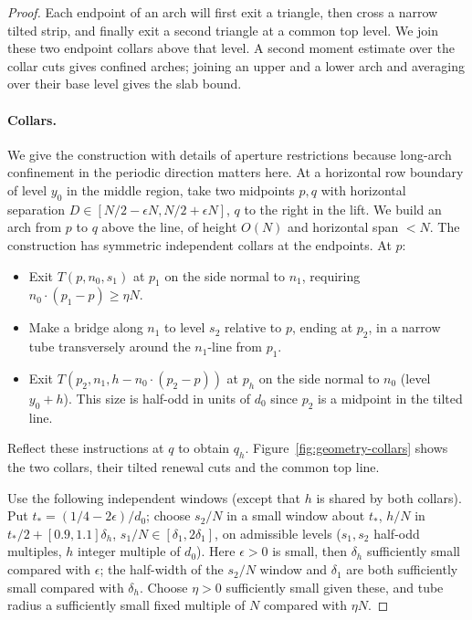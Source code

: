 \begin{proof}
Each endpoint of an arch will first exit a triangle, then cross a narrow tilted strip, and finally exit a second triangle at a common top level. We join these two endpoint collars above that level. A second moment estimate over the collar cuts gives confined arches; joining an upper and a lower arch and averaging over their base level gives the slab bound.

\paragraph{Collars.}

We give the construction with details of aperture restrictions because long-arch confinement in the periodic direction matters here. At a horizontal row boundary of level \(y_0\) in the middle region, take two midpoints \(p,q\) with horizontal separation \(D\in[N/2-\epsilon N,N/2+\epsilon N]\), \(q\) to the right in the lift. We build an arch from \(p\) to \(q\) above the line, of height \(O(N)\) and horizontal span \(<N\). The construction has symmetric independent collars at the endpoints. At \(p\):

\begin{itemize}

\item 

Exit \(T(p,n_0,s_1)\) at \(p_1\) on the side normal to \(n_1\), requiring \(n_0\cdot(p_1-p)\ge\eta N\).

\item 

Make a bridge along \(n_1\) to level \(s_2\) relative to \(p\), ending at \(p_2\), in a narrow tube transversely around the \(n_1\)-line from \(p_1\).

\item 

Exit \(T(p_2,n_1,h-n_0\cdot(p_2-p))\) at \(p_h\) on the side normal to \(n_0\) (level \(y_0+h\)). This size is half-odd in units of \(d_0\) since \(p_2\) is a midpoint in the tilted line.

\end{itemize}

Reflect these instructions at \(q\) to obtain \(q_h\). Figure~\ref{fig:geometry-collars} shows the two collars, their tilted renewal cuts and the common top line.

Use the following independent windows (except that \(h\) is shared by both collars). Put \(t_*=(1/4-2\epsilon)/d_0\); choose \(s_2/N\) in a small window about \(t_*\), \(h/N\) in \(t_*/2+[0.9,1.1]\delta_h\), \(s_1/N\in[\delta_1,2\delta_1]\), on admissible levels (\(s_1,s_2\) half-odd multiples, \(h\) integer multiple of \(d_0\)). Here \(\epsilon>0\) is small, then \(\delta_h\) sufficiently small compared with \(\epsilon\); the half-width of the \(s_2/N\) window and \(\delta_1\) are both sufficiently small compared with \(\delta_h\). Choose \(\eta>0\) sufficiently small given these, and tube radius a sufficiently small fixed multiple of \(N\) compared with \(\eta N\).


\end{proof}
